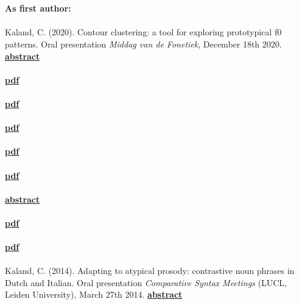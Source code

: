 \documentclass[a4paper,11pt]{article}
\begin{document}
\section*{}
\textbf{As first author:}\\\\
Kaland, C. (2020). Contour clustering: a tool for exploring prototypical f0 patterns. Oral presentation \textit{Middag van de Fonetiek}, December 18th 2020. \textcolor{red}{\textbf{\lbrack\href{https://www.nvfw.org/sites/nvfw.org/files/Abstract_MvdF2020_Kaland.pdf}{abstract}\rbrack}}\\\\
 \textcolor{red}{\textbf{\lbrack\href{https://www.isca-speech.org/archive/SpeechProsody_2020/pdfs/25.pdf}{pdf}\rbrack}}\\\\
 \textcolor{red}{\textbf{\lbrack\href{https://www.isca-speech.org/archive/SpeechProsody_2020/pdfs/24.pdf}{pdf}\rbrack}}\\\\
 \textcolor{red}{\textbf{\lbrack\href{http://intro2psycholing.net/ICPhS/papers/ICPhS_1361.pdf}{pdf}\rbrack}}\\\\
 \textcolor{red}{\textbf{\lbrack\href{http://intro2psycholing.net/ICPhS/papers/ICPhS_2920.pdf}{pdf}\rbrack}}\\\\
 \textcolor{red}{\textbf{\lbrack\href{https://www.isca-speech.org/archive/SpeechProsody_2018/pdfs/13.pdf}{pdf}\rbrack}}\\\\
 \textcolor{red}{\textbf{\lbrack\href{https://typo3.univie.ac.at/fileadmin/user_upload/p_exapp2016/EXAPP-Abstracts/Kaland_Production.PDF}{abstract}\rbrack}}\\\\
 \textcolor{red}{\textbf{\lbrack\href{http://www.isca-speech.org/archive/Interspeech_2016/pdfs/0418.PDF}{pdf}\rbrack}}\\\\
 \textcolor{red}{\textbf{\lbrack\href{http://www.isca-speech.org/archive/tal_2014/papers/tl14_160.pdf}{pdf}\rbrack}}\\\\
Kaland, C. (2014). Adapting to atypical prosody: contrastive noun phrases in Dutch and Italian. Oral presentation \textit{Comparative Syntax Meetings} (LUCL, Leiden University), March 27th 2014. \textcolor{red}{\textbf{\lbrack\href{http://romancelab.weblog.leidenuniv.nl/2014/03/25/constantijn-kaland-thursday-27-march/}{abstract}\rbrack}}\\\\
\end{document}
